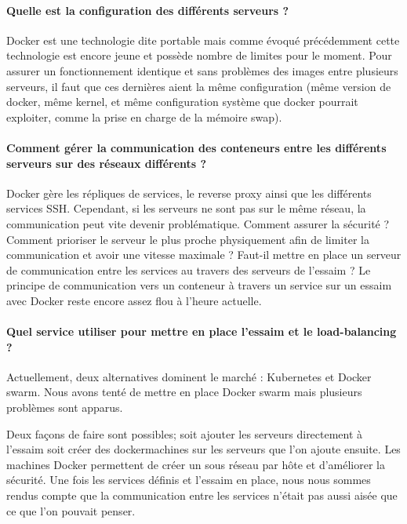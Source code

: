 \paragraph{Quelle est la configuration des différents serveurs ?}

\par Docker est une technologie dite portable mais comme évoqué précédemment cette technologie est encore jeune et possède nombre de limites pour le moment. Pour assurer un fonctionnement identique et sans problèmes des images entre plusieurs serveurs, il faut que ces dernières aient la même configuration (même version de docker, même kernel, et même configuration système que docker pourrait exploiter, comme la prise en charge de la mémoire swap).

\paragraph{Comment gérer la communication des conteneurs entre les différents serveurs sur des réseaux différents ?}

\par Docker gère les répliques de services, le reverse proxy ainsi que les différents services SSH. Cependant, si les serveurs ne sont pas sur le même réseau, la communication peut vite devenir problématique. Comment assurer la sécurité ? Comment prioriser le serveur le plus proche physiquement afin de limiter la communication et avoir une vitesse maximale ? Faut-il mettre en place un serveur de communication entre les services au travers des serveurs de l’essaim ? Le principe de communication vers un conteneur à travers un service sur un essaim avec Docker reste encore assez flou à l’heure actuelle.

\paragraph{Quel service utiliser pour mettre en place l’essaim et le load-balancing ?}

\par Actuellement, deux alternatives dominent le marché : Kubernetes et Docker swarm. Nous avons tenté de mettre en place Docker swarm mais plusieurs problèmes sont apparus. \\

\par Deux façons de faire sont possibles; soit ajouter les serveurs directement à l’essaim soit créer des \gls{dockermachine}s sur les serveurs que l’on ajoute ensuite. Les machines Docker permettent de créer un sous réseau par hôte et d’améliorer la sécurité. Une fois les services définis et l’essaim en place, nous nous sommes rendus compte que la communication entre les services n’était pas aussi aisée que ce que l’on pouvait penser.

